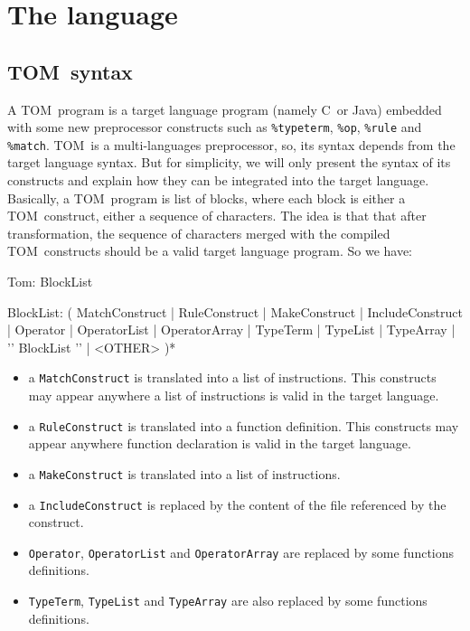 \documentclass[a4paper]{article}
\newcommand{\TOM}{\textsf{TOM}}
\newcommand{\C}{\textsf{C}}
\newcommand{\Java}{\textsf{Java}}
\newenvironment{grammar}%
{\endgraf\verbatim}%
{\endverbatim}
\begin{document}
\section{The language}

\subsection{\TOM\ syntax}
A \TOM\ program is a target language program (namely \C\ or \Java)
embedded with some new preprocessor constructs such as
\texttt{\%typeterm}, \texttt{\%op}, \texttt{\%rule} and
\texttt{\%match}.
\TOM\ is a multi-languages preprocessor, so, its syntax depends from 
the target language syntax. But for simplicity, we will only present
the syntax of its constructs and explain how they can be integrated
into the target language.
Basically, a \TOM\ program is list of blocks, where each block is
either a \TOM\ construct, either a sequence of characters.
The idea is that that after transformation, the sequence of characters
merged with the compiled \TOM\ constructs should be a valid target
language program.
So we have:

\begin{grammar}
Tom: 
     BlockList

BlockList:
     (
       MatchConstruct
     | RuleConstruct
     | MakeConstruct
     | IncludeConstruct
     | Operator
     | OperatorList
     | OperatorArray
     | TypeTerm
     | TypeList
     | TypeArray
     | '{' BlockList '}'
     | <OTHER>
     )*
\end{grammar}

\begin{itemize}
\item a \texttt{MatchConstruct} is translated into a list of
  instructions. This constructs may appear anywhere a list of
  instructions is valid in the target language.

\item a \texttt{RuleConstruct} is translated into a function
  definition. This constructs may appear anywhere function declaration
  is valid in the target language. 

\item a \texttt{MakeConstruct} is translated into a list of
  instructions.

\item a \texttt{IncludeConstruct} is replaced by the content of the
  file referenced by the construct.

\item \texttt{Operator}, \texttt{OperatorList} and
  \texttt{OperatorArray} are replaced by some functions definitions.
 
\item \texttt{TypeTerm}, \texttt{TypeList} and \texttt{TypeArray} are
  also replaced by some functions definitions.
\end{itemize}
\end{document}
